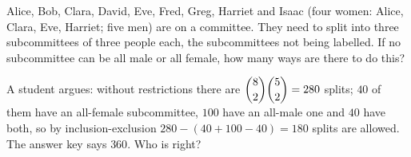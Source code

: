 Alice, Bob, Clara, David, Eve, Fred, Greg, Harriet and Isaac (four women: Alice, Clara, Eve, Harriet; five men) are on a committee. They need to split into three subcommittees of three people each, the subcommittees not being labelled. If no subcommittee can be all male or all female, how many ways are there to do this?

A student argues: without restrictions there are $\dbinom82\dbinom52=280$ splits; $40$ of them have an all-female subcommittee, $100$ have an all-male one and $40$ have both, so by inclusion-exclusion $280-(40+100-40)=180$ splits are allowed. The answer key says $360$. Who is right?
